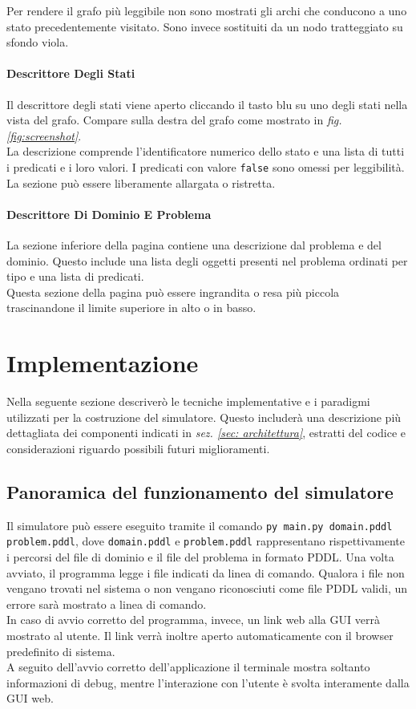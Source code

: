 \documentclass[a4paper, 11pt, titlepage, twoside, openany]{book}
\begin{document}
Per rendere il grafo più leggibile non sono mostrati gli archi che conducono a uno stato precedentemente visitato. Sono invece sostituiti da un nodo tratteggiato su sfondo viola.

\paragraph{Descrittore Degli Stati}
Il descrittore degli stati viene aperto cliccando il tasto blu su uno degli stati nella vista del grafo. Compare sulla destra del grafo come mostrato in \textit{fig. \ref{fig:screenshot}}.\\
La descrizione comprende l'identificatore numerico dello stato e una lista di tutti i predicati e i loro valori. I predicati con valore \texttt{false} sono omessi per leggibilità. \\
La sezione può essere liberamente allargata o ristretta.

\paragraph{Descrittore Di Dominio E Problema}
La sezione inferiore della pagina contiene una descrizione dal problema e del dominio. Questo include una lista degli oggetti presenti nel problema ordinati per tipo e una lista di predicati. \\
Questa sezione della pagina può essere ingrandita o resa più piccola trascinandone il limite superiore in alto o in basso.

\section{Implementazione}
\label{sec:implementazione}
Nella seguente sezione descriverò le tecniche implementative e i paradigmi utilizzati per la costruzione del simulatore. Questo includerà una descrizione più dettagliata dei componenti indicati in \textit{sez. \ref{sec: architettura}}, estratti del codice e considerazioni riguardo possibili futuri miglioramenti.

\subsection{Panoramica del funzionamento del simulatore}
Il simulatore può essere eseguito tramite il comando \texttt{py main.py domain.pddl problem.pddl}, dove \texttt{domain.pddl} e \texttt{problem.pddl} rappresentano rispettivamente i percorsi del file di dominio e il file del problema in formato PDDL.
Una volta avviato, il programma legge i file indicati da linea di comando. Qualora i file non vengano trovati nel sistema o non vengano riconosciuti come file PDDL validi, un errore sarà mostrato a linea di comando. \\
In caso di avvio corretto del programma, invece, un link web alla GUI verrà mostrato al utente. Il link verrà inoltre aperto automaticamente con il browser predefinito di sistema. \\
A seguito dell'avvio corretto dell'applicazione il terminale mostra soltanto informazioni di debug, mentre l'interazione con l'utente è svolta interamente dalla GUI web.
\end{document}
